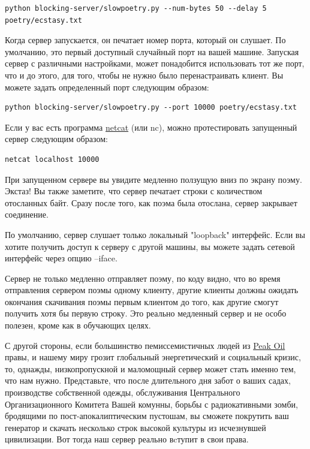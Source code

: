 \begin{scriptsize}\begin{verbatim}
python blocking-server/slowpoetry.py --num-bytes 50 --delay 5 poetry/ecstasy.txt
\end{verbatim}\end{scriptsize}


Когда сервер запускается, он печатает номер порта, который он 
слушает. По умолчанию, это первый доступный случайный порт на вашей машине. 
Запуская сервер с различными настройками, может понадобится использовать 
тот же порт, что и до этого, для того, чтобы не нужно было 
перенастраивать клиент. Вы можете задать определенный порт следующим образом:

\begin{scriptsize}\begin{verbatim}
python blocking-server/slowpoetry.py --port 10000 poetry/ecstasy.txt
\end{verbatim}\end{scriptsize}

Если у вас есть программа 
\href{http://netcat.sourceforge.net/}{netcat} (или nc), можно протестировать 
запущенный сервер следующим образом:

\begin{scriptsize}\begin{verbatim}
netcat localhost 10000
\end{verbatim}\end{scriptsize}


При запущенном сервере вы увидите медленно ползущую 
вниз по экрану поэму. Экстаз! Вы также заметите, что сервер 
печатает строки с количеством отосланных байт. Сразу после того, как 
поэма была отослана, сервер закрывает соединение.


По умолчанию, сервер слушает только локальный "loopback" 
интерфейс. Если вы хотите получить доступ к серверу с 
другой машины, вы можете задать сетевой интерфейс через 
опцию --iface.


Сервер не только медленно отправляет поэму, по коду видно, что 
во время отправления сервером поэмы одному клиенту, другие 
клиенты должны ожидать окончания скачивания поэмы первым клиентом 
до того, как другие смогут получить хотя бы первую строку. 
Это реально медленный сервер и не особо полезен, кроме как 
в обучающих целях. 


С другой стороны, если большинство пемиссемистичных 
людей из 
\href{http://www.peakoil.net/}{Peak Oil} правы, и нашему миру грозит 
глобальный энергетический и социальный кризис, то, однажды, 
низкопропускной и маломощный сервер может стать именно тем, что нам 
нужно. Представьте, что после длительного дня забот о ваших 
садах, производстве собственной одежды, обслуживания 
Центрального Организационного Комитета Вашей комунны, борьбы 
с радиокативными зомби, бродящими по пост-апокалиптическим 
пустошам, вы сможете покрутить ваш генератор и скачать 
несколько строк высокой культуры из исчезнувшей цивилизации. 
Вот тогда наш сервер реально вcтупит в свои права. 


